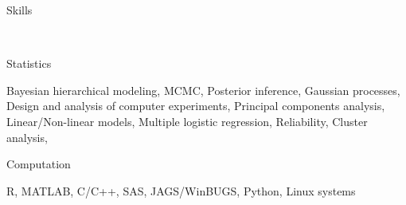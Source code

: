 \documentclass[12pt]{article}
\newcommand{\head}[1]{ %
    \bigskip %
    \bigskip %
    \begin{Large}\begin{bf}{#1}\end{bf}\end{Large} %

    \ \\ [-1.3cm] %

    \hrulefill}
\newcommand{\subhead}[1]{\begin{sc}{#1}\end{sc}}
\begin{document}
\head{Skills}

\subhead{Statistics}

Bayesian hierarchical modeling, MCMC, Posterior inference, Gaussian processes, Design and analysis of computer experiments, Principal components analysis, Linear/Non-linear models, Multiple logistic regression, Reliability, Cluster analysis,

\subhead{Computation}

R, MATLAB, C/C++, SAS, JAGS/WinBUGS, Python, Linux systems

\bigskip
\end{document}
